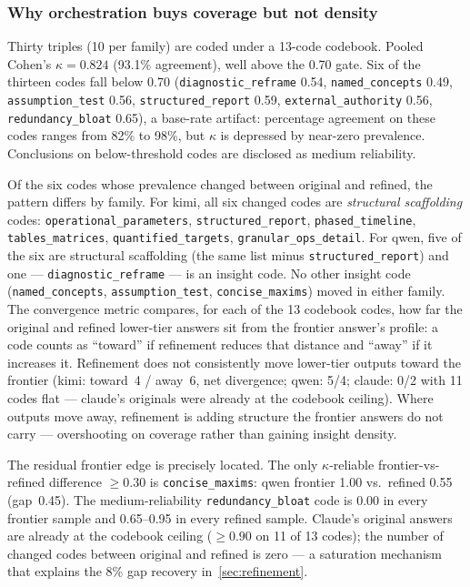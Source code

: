 \documentclass[12pt,a4paper]{article}
\begin{document}
\subsubsection{Why orchestration buys coverage but not density}\label{sec:mechanism}

Thirty triples (10 per family) are coded under a 13-code codebook. Pooled
Cohen's $\kappa = 0.824$ (93.1\% agreement), well above the 0.70 gate. Six of
the thirteen codes fall below 0.70 (\texttt{diagnostic\_reframe} 0.54,
\texttt{named\_concepts} 0.49, \texttt{assumption\_test} 0.56,
\texttt{structured\_report} 0.59, \texttt{external\_authority} 0.56,
\texttt{redundancy\_bloat} 0.65), a base-rate artifact: percentage agreement on
these codes ranges from 82\% to 98\%, but $\kappa$ is depressed by near-zero
prevalence. Conclusions on below-threshold codes are disclosed as medium
reliability.

Of the six codes whose prevalence changed between original and refined, the
pattern differs by family. For kimi, all six changed codes are
\emph{structural scaffolding} codes: \texttt{operational\_parameters},
\texttt{structured\_report}, \texttt{phased\_timeline},
\texttt{tables\_matrices}, \texttt{quantified\_targets},
\texttt{granular\_ops\_detail}. For qwen, five of the six are structural
scaffolding (the same list minus \texttt{structured\_report}) and one ---
\texttt{diagnostic\_reframe} --- is an insight code. No other insight code
(\texttt{named\_concepts}, \texttt{assumption\_test},
\texttt{concise\_maxims}) moved in either family. The convergence metric compares, for each of the 13 codebook codes, how far
the original and refined lower-tier answers sit from the frontier answer's
profile: a code counts as ``toward'' if refinement reduces that distance and
``away'' if it increases it. Refinement does not consistently move lower-tier
outputs toward the frontier (kimi: toward~4 / away~6, net divergence; qwen:
5/4; claude: 0/2 with 11 codes flat --- claude's originals were already at the
codebook ceiling). Where outputs move away, refinement is adding structure the
frontier answers do not carry --- overshooting on coverage rather than gaining
insight density.

The residual frontier edge is precisely located. The only $\kappa$-reliable
frontier-vs-refined difference $\ge 0.30$ is \texttt{concise\_maxims}: qwen
frontier 1.00 vs.\ refined 0.55 (gap~0.45). The medium-reliability
\texttt{redundancy\_bloat} code is 0.00 in every frontier sample and 0.65--0.95
in every refined sample. Claude's original answers are already at the codebook
ceiling ($\ge 0.90$ on 11 of 13 codes); the number of changed codes between
original and refined is zero --- a saturation mechanism that explains the 8\%
gap recovery in~\cref{sec:refinement}.
\end{document}
